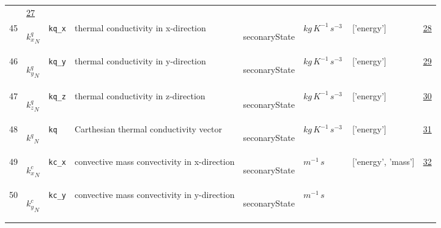 \begin{longtable}{|p{1cm}|p{3cm}|p{3cm}|p{7cm}|p{3.0cm}|p{3cm}|p{2cm}|p{1cm}|}
             & \hyperlink{"e:27"}{ 27 }
                 \\
    45
             & \hypertarget{"v:45"}{ $ {k^{q}_{x}}_{N} $}
             & \verb|kq_x|
             & thermal conductivity in x-direction
             & \begin{lay}seconaryState \end{lay}
             & $ kg \,K^{-1} \,s^{-3} \, $
             & ['energy']
             & \hyperlink{"e:28"}{ 28 }
                 \\
    46
             & \hypertarget{"v:46"}{ $ {k^{q}_{y}}_{N} $}
             & \verb|kq_y|
             & thermal conductivity in y-direction
             & \begin{lay}seconaryState \end{lay}
             & $ kg \,K^{-1} \,s^{-3} \, $
             & ['energy']
             & \hyperlink{"e:29"}{ 29 }
                 \\
    47
             & \hypertarget{"v:47"}{ $ {k^{q}_{z}}_{N} $}
             & \verb|kq_z|
             & thermal conductivity in z-direction
             & \begin{lay}seconaryState \end{lay}
             & $ kg \,K^{-1} \,s^{-3} \, $
             & ['energy']
             & \hyperlink{"e:30"}{ 30 }
                 \\
    48
             & \hypertarget{"v:48"}{ $ {k^{q}}_{N} $}
             & \verb|kq|
             & Carthesian thermal conductivity vector
             & \begin{lay}seconaryState \end{lay}
             & $ kg \,K^{-1} \,s^{-3} \, $
             & ['energy']
             & \hyperlink{"e:31"}{ 31 }
                 \\
    49
             & \hypertarget{"v:49"}{ $ {k^{c}_{x}}_{N} $}
             & \verb|kc_x|
             & convective mass convectivity in x-direction
             & \begin{lay}seconaryState \end{lay}
             & $ m^{-1} \,s \, $
             & ['energy', 'mass']
             & \hyperlink{"e:32"}{ 32 }
                 \\
    50
             & \hypertarget{"v:50"}{ $ {k^{c}_{y}}_{N} $}
             & \verb|kc_y|
             & convective mass convectivity in y-direction
             & \begin{lay}seconaryState \end{lay}
             & $ m^{-1} \,s \, $

\end{longtable}

